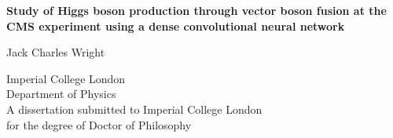 
\begin{titlepage}
    \begin{center}
        \vspace*{2cm}
        
        \huge{\textbf{Study of Higgs boson production through vector boson fusion at the CMS experiment using a dense convolutional neural network}}

        \vspace{1.5cm}
        \normalsize
        Jack Charles Wright
        
        \vspace{0.5cm}
        Imperial College London\\
        Department of Physics\\

        \vspace{5cm}
        A dissertation submitted to Imperial College London\\
        for the degree of Doctor of Philosophy\\
        
    \end{center}
\end{titlepage}

